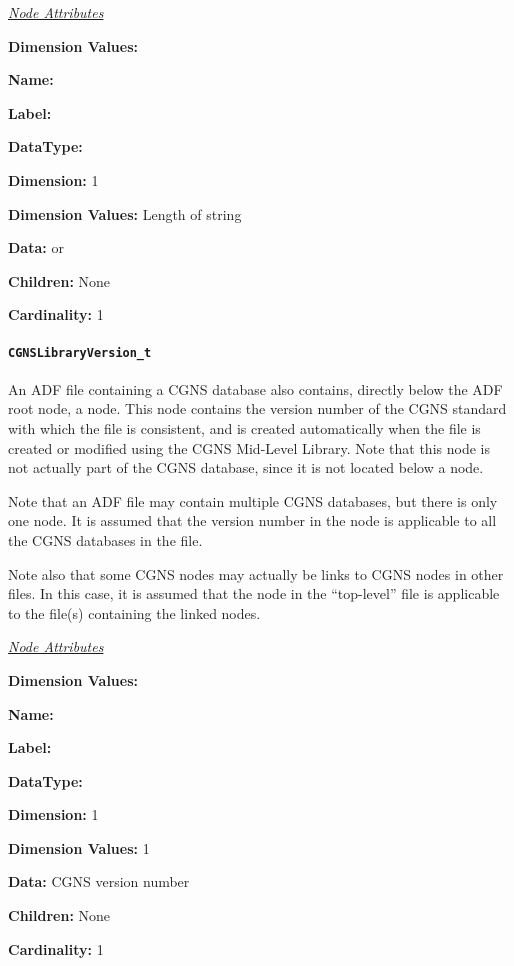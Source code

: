 \textit{\uline{Node Attributes}}
\begin{Ventryic}{\textbf{Dimension Values:}}
\item [\textbf{Name:}]
\item [\textbf{Label:}]
\item [\textbf{DataType:}]
\item [\textbf{Dimension:}]
      1
\item [\textbf{Dimension Values:}]
      Length of string
\item [\textbf{Data:}]
       or 
\item [\textbf{Children:}]
      None
\item [\textbf{Cardinality:}]
      1
\end{Ventryic}

\paragraph{\texttt{CGNSLibraryVersion\_t}}

An ADF file containing a CGNS database also contains, directly below the
ADF root node, a  node.
This node contains the version number of the CGNS standard with which
the file is consistent, and is created automatically when the file is
created or modified using the CGNS Mid-Level Library.
Note that this node is not actually part of the CGNS database, since
it is not located below a  node.

Note that an ADF file may contain multiple CGNS databases, but there is
only one  node.
It is assumed that the version number in the 
node is applicable to all the CGNS databases in the file.

Note also that some CGNS nodes may actually be links to CGNS nodes in
other files.
In this case, it is assumed that the  node
in the ``top-level'' file is applicable to the file(s) containing the
linked nodes.

\textit{\uline{Node Attributes}}
\begin{Ventryic}{\textbf{Dimension Values:}}
\item [\textbf{Name:}]
\item [\textbf{Label:}]
\item [\textbf{DataType:}]
\item [\textbf{Dimension:}]
      1
\item [\textbf{Dimension Values:}]
      1
\item [\textbf{Data:}]
      CGNS version number
\item [\textbf{Children:}]
      None
\item [\textbf{Cardinality:}]
      1
\end{Ventryic}

